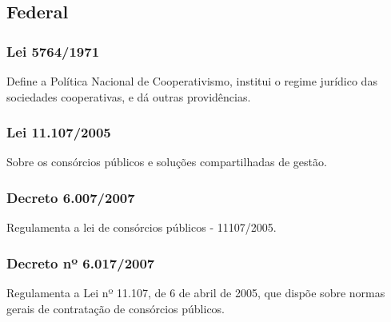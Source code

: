 \begin{subapend}
	\subsection{Federal}
	\begin{subsubapend}
		\item \subsubsection{Lei 5764/1971}
		Define a Política Nacional de Cooperativismo, institui o regime jurídico das sociedades cooperativas, e dá outras providências.
		\subsubsection{Lei 11.107/2005}
		Sobre os consórcios públicos e soluções compartilhadas de gestão.
		\subsubsection{Decreto 6.007/2007}
		Regulamenta a lei de consórcios públicos - 11107/2005.
		\subsubsection{Decreto nº 6.017/2007}
		Regulamenta a Lei nº 11.107, de 6 de abril de 2005, que dispõe sobre normas gerais de contratação de consórcios públicos.
	\end{subsubapend}
\end{subapend}

